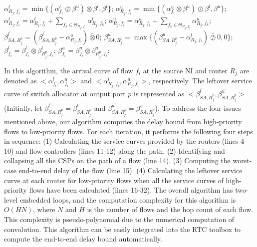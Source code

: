 \documentclass[10pt,journal]{IEEEtran}
\begin{document}
\begin{algorithm}
\begin{algorithmic}[1]
                \STATE $\alpha^l_{R_j,f_i}=\min\{(\alpha^l_{f_i}\oslash\beta^u)\otimes\beta^l,\beta^l\}$;
                \STATE $\alpha^u_{R_j,f_i}=\min\{(\alpha^u_{f_i}\otimes\beta^u)\oslash\beta^l,\beta^u\}$;
                    \STATE $\alpha^l_{R_j,f_i}=\alpha^l_{R_j,f_i}+\sum_{f_k\in\Theta_{R_j,f_i}}\alpha^l_{R_j,f_k}$;
                    \STATE $\alpha^u_{R_j,f_i}=\alpha^u_{R_j,f_i}+\sum_{f_k\in\Theta_{R_j,f_i}}\alpha^u_{R_j,f_k}$;
                    \STATE $\beta^{l^\prime}_{SA,R_j^{p}}=(\beta^{l^\prime}_{SA,R_j^{p}}-\alpha^u_{R_j,f_i})\bar{\otimes}0$;
                    \STATE $\beta^{u^\prime}_{SA,R_j^{p}}=\max\{(\beta^{u^\prime}_{SA,R_j^{p}}-\alpha^l_{R_j,f_i})\bar{\oslash}0,0\}$;
                \ENDIF
            \ENDIF
            \STATE $\beta_{f_i}^l=\beta_{f_i}^l\otimes\beta^l_{R_j^{p},f_i}$; $\beta_{f_i}^u=\beta_{f_i}^u\otimes\beta^u_{R_j^{p},f_i}$;
        \ENDFOR
    \ENDFOR
\end{algorithmic}
\end{algorithm}

In this algorithm, the arrival curve of flow $f_i$ at the source NI and router $R_j$ are denoted as $<\alpha_{f_i}^l,\alpha_{f_i}^u>$ and $<\alpha_{R_j,f_i}^l,\alpha_{R_j,f_i}^u>$, respectively. The leftover service curve of switch allocator at output port $p$ is represented as $<\beta_{SA,R_j^{p}}^{l^\prime},\beta_{SA,R_j^{p}}^{u^\prime}>$ (Initially, let $\beta_{SA,R_j^{p}}^{l^\prime}=\beta_{SA,R_j^{p}}^{l}$ and $\beta_{SA,R_j^{p}}^{u^\prime}=\beta_{SA,R_j^{p}}^{u}$). To address the four issues mentioned above, our algorithm computes the delay bound from high-priority flows to low-priority flows. For each iteration, it performs the following four steps in sequence: (1) Calculating the service curves provided by the routers (lines 4-10) and flow controllers (lines 11-12) along the path. (2) Identifying and collapsing all the CSPs on the path of a flow (line 14). (3) Computing the worst-case end-to-end delay of the flow (line 15). (4) Calculating the leftover service curve at each router for low-priority flows when all the service curves of high-priority flows have been calculated (lines 16-32). The overall algorithm has two-level embedded loops, and the computation complexity for this algorithm is $O(HN)$, where $N$ and $H$ is the number of flows and the hop count of each flow. This complexity is pseudo-polynomial due to the numerical computation of convolution. This algorithm can be easily integrated into the RTC toolbox \cite{rtc} to compute the end-to-end delay bound automatically.
\end{document}
